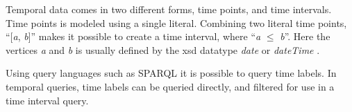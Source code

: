 Temporal data comes in two different forms, time points, and time intervals. Time points is modeled using a single literal. Combining two literal time points, ``[\emph{a}, \emph{b}]'' makes it possible to create a time interval, where ``\emph{a} $\leq$ \emph{b}''. Here the vertices \emph{a} and \emph{b} is usually defined by the xsd datatype \emph{date} or \emph{dateTime} \cite{tappolet2009applied}.

Using query languages such as SPARQL it is possible to query time labels. In temporal queries, time labels can be queried directly, and filtered for use in a time interval query. 

\glsresetall